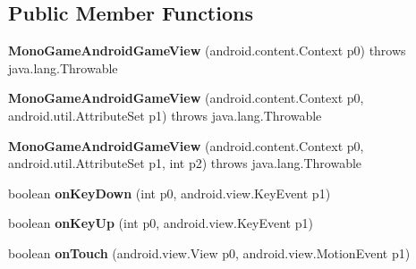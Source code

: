 \subsection*{Public Member Functions}
\begin{DoxyCompactItemize}
\item 
\hypertarget{classmd5cedead65730cfb9c4b33fbfd5914d87f_1_1MonoGameAndroidGameView_a4d0e55b6b50ccc0e2b62561fc9c809ea}{}{\bfseries Mono\+Game\+Android\+Game\+View} (android.\+content.\+Context p0)  throws java.\+lang.\+Throwable 	\label{classmd5cedead65730cfb9c4b33fbfd5914d87f_1_1MonoGameAndroidGameView_a4d0e55b6b50ccc0e2b62561fc9c809ea}

\item 
\hypertarget{classmd5cedead65730cfb9c4b33fbfd5914d87f_1_1MonoGameAndroidGameView_a340c5b52d2b594c8b0951da486a06de2}{}{\bfseries Mono\+Game\+Android\+Game\+View} (android.\+content.\+Context p0, android.\+util.\+Attribute\+Set p1)  throws java.\+lang.\+Throwable 	\label{classmd5cedead65730cfb9c4b33fbfd5914d87f_1_1MonoGameAndroidGameView_a340c5b52d2b594c8b0951da486a06de2}

\item 
\hypertarget{classmd5cedead65730cfb9c4b33fbfd5914d87f_1_1MonoGameAndroidGameView_ae22062cbabd500fea1e60db8b0af4e78}{}{\bfseries Mono\+Game\+Android\+Game\+View} (android.\+content.\+Context p0, android.\+util.\+Attribute\+Set p1, int p2)  throws java.\+lang.\+Throwable 	\label{classmd5cedead65730cfb9c4b33fbfd5914d87f_1_1MonoGameAndroidGameView_ae22062cbabd500fea1e60db8b0af4e78}

\item 
\hypertarget{classmd5cedead65730cfb9c4b33fbfd5914d87f_1_1MonoGameAndroidGameView_a7365973669fe21d13f69b206675b403c}{}boolean {\bfseries on\+Key\+Down} (int p0, android.\+view.\+Key\+Event p1)\label{classmd5cedead65730cfb9c4b33fbfd5914d87f_1_1MonoGameAndroidGameView_a7365973669fe21d13f69b206675b403c}

\item 
\hypertarget{classmd5cedead65730cfb9c4b33fbfd5914d87f_1_1MonoGameAndroidGameView_ad09d82345040f046719006dd4b7f1c89}{}boolean {\bfseries on\+Key\+Up} (int p0, android.\+view.\+Key\+Event p1)\label{classmd5cedead65730cfb9c4b33fbfd5914d87f_1_1MonoGameAndroidGameView_ad09d82345040f046719006dd4b7f1c89}

\item 
\hypertarget{classmd5cedead65730cfb9c4b33fbfd5914d87f_1_1MonoGameAndroidGameView_a2a5e194813fce97f604d0b69e08e6b01}{}boolean {\bfseries on\+Touch} (android.\+view.\+View p0, android.\+view.\+Motion\+Event p1)\label{classmd5cedead65730cfb9c4b33fbfd5914d87f_1_1MonoGameAndroidGameView_a2a5e194813fce97f604d0b69e08e6b01}


\end{DoxyCompactItemize}
